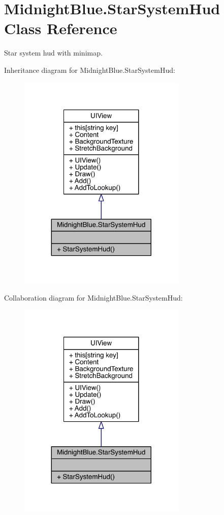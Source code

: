 \hypertarget{class_midnight_blue_1_1_star_system_hud}{}\section{Midnight\+Blue.\+Star\+System\+Hud Class Reference}
\label{class_midnight_blue_1_1_star_system_hud}


Star system hud with minimap.  




Inheritance diagram for Midnight\+Blue.\+Star\+System\+Hud\+:\nopagebreak
\begin{figure}[H]
\begin{center}
\leavevmode
\includegraphics[width=227pt]{class_midnight_blue_1_1_star_system_hud__inherit__graph}
\end{center}
\end{figure}


Collaboration diagram for Midnight\+Blue.\+Star\+System\+Hud\+:\nopagebreak
\begin{figure}[H]
\begin{center}
\leavevmode
\includegraphics[width=227pt]{class_midnight_blue_1_1_star_system_hud__coll__graph}
\end{center}
\end{figure}
